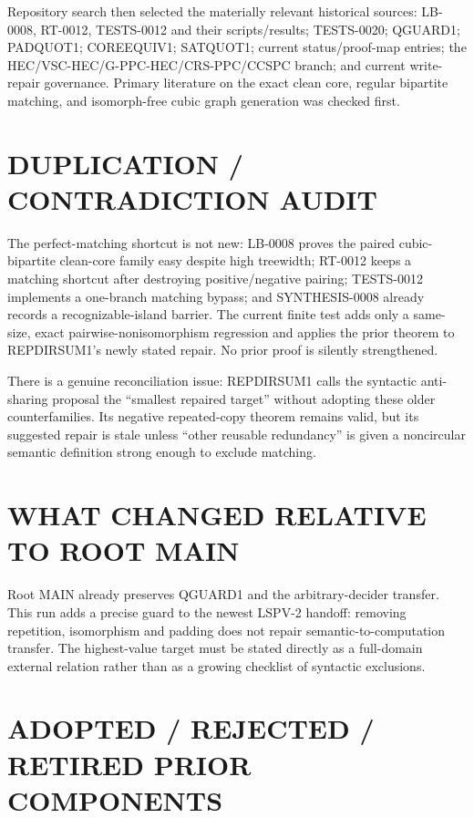 \documentclass[11pt]{article}
\begin{document}
Repository search then selected the materially relevant historical sources:
LB-0008, RT-0012, TESTS-0012 and their scripts/results; TESTS-0020; QGUARD1;
PADQUOT1; COREEQUIV1; SATQUOT1; current status/proof-map entries; the
HEC/VSC-HEC/G-PPC-HEC/CRS-PPC/CCSPC branch; and current write-repair
governance.  Primary literature on the exact clean core, regular bipartite
matching, and isomorph-free cubic graph generation was checked first.

\section{DUPLICATION / CONTRADICTION AUDIT}

The perfect-matching shortcut is not new: LB-0008 proves the paired
cubic-bipartite clean-core family easy despite high treewidth; RT-0012 keeps a
matching shortcut after destroying positive/negative pairing; TESTS-0012
implements a one-branch matching bypass; and SYNTHESIS-0008 already records a
recognizable-island barrier.  The current finite test adds only a same-size,
exact pairwise-nonisomorphism regression and applies the prior theorem to
REPDIRSUM1's newly stated repair.  No prior proof is silently strengthened.

There is a genuine reconciliation issue: REPDIRSUM1 calls the syntactic
anti-sharing proposal the ``smallest repaired target'' without adopting these
older counterfamilies.  Its negative repeated-copy theorem remains valid, but
its suggested repair is stale unless ``other reusable redundancy'' is given a
noncircular semantic definition strong enough to exclude matching.

\section{WHAT CHANGED RELATIVE TO ROOT MAIN}

Root MAIN already preserves QGUARD1 and the arbitrary-decider transfer.  This
run adds a precise guard to the newest LSPV-2 handoff: removing repetition,
isomorphism and padding does not repair semantic-to-computation transfer.
The highest-value target must be stated directly as a full-domain external
relation rather than as a growing checklist of syntactic exclusions.

\section{ADOPTED / REJECTED / RETIRED PRIOR COMPONENTS}
\end{document}
